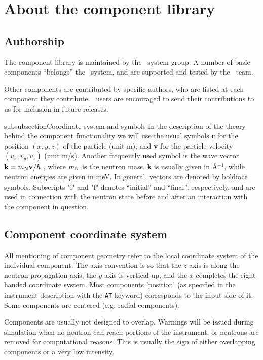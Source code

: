 
\chapter{About the component library}
\label{c:components}

\section{Authorship}
The component library is
maintained by the \MCS\ system group. A number of basic components
``belongs'' the \MCS\ system, and are supported and tested by the \MCS\
team.

Other components are contributed
by specific authors, who are listed at each component
they contribute.
\MCS\ users are encouraged to send their
contributions to us for inclusion in future releases.

subsubsection{Coordinate system and symbols}
In the description of the theory behind the component functionality
we will use the usual symbols {\bf r} for the position
$(x,y,z)$ of the particle (unit m), and {\bf v} for
the particle velocity $(v_x, v_y, v_z)$ (unit m/s).
Another frequently used symbol is
the wave vector ${\bf k} = m_{\rm N} {\bf v}/\hbar$ , where
$m_{\rm N}$ is the neutron mass. {\bf k} is usually given in
\AA$^{-1}$, while neutron energies are given in meV.
In general, vectors are denoted by boldface symbols.
Subscripts "i" and "f" denotes ``initial'' and ``final'', respectively,
and are used in connection with the neutron state before and after
an interaction with the component in question.

\section{Component coordinate system}
All mentioning of component geometry refer to
the local coordinate system of the individual component.
The axis convention is so that the $z$ axis is along
the neutron propagation axis, the $y$ axis is vertical up,
and the $x$ completes the right-handed coordinate system.
Most components 'position' (as specified in the instrument description with the \verb+AT+ keyword) corresponds to the input side of it. Some components are centered (e.g. radial components).
\index{Symbols}\index{Coordinates system}

Components are usually not designed to overlap. Warnings will be issued during simulation when no neutron can reach portions of the instrument, or neutrons are removed for computational reasons. This is usually the sign of either overlapping components or a very low intensity.

